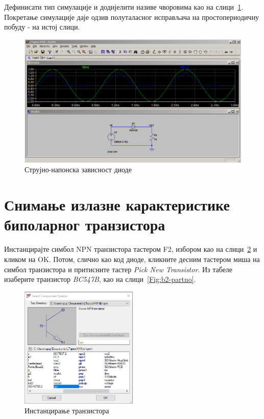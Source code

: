 Дефинисати тип симулације и додијелити називе чворовима као на слици~\ref{Fig:hwr-tran2}. Покретање симулације даје одзив полуталасног исправљача на простопериодичну побуду - на истој слици.

\begin{figure}[h]
\centering
\includegraphics[width=\figwidth\textwidth]{figs/hwr-tran2.PNG}
\caption{Струјно-напонска зависност диоде}
\label{Fig:hwr-tran2}
\end{figure}

\section{Снимање излазне карактеристике биполарног транзистора}
\label{transfer-bjt}

Инстанцирајте симбол NPN транзистора тастером F2, избором као на слици~\ref{Fig:b1-instance} и кликом на OK. Потом, слично као код диоде, кликните десним тастером миша на симбол транзистора и притисните тастер \textit{Pick New Transistor}. Из табеле изаберите транзистор \textit{BC547B}, као на слици~\ref{Fig:b2-partno}.

\begin{figure}[h]
\centering
\includegraphics[width=0.5\textwidth]{figs/b1.PNG}
\caption{Инстанцирање транзистора}
\label{Fig:b1-instance}
\end{figure}

